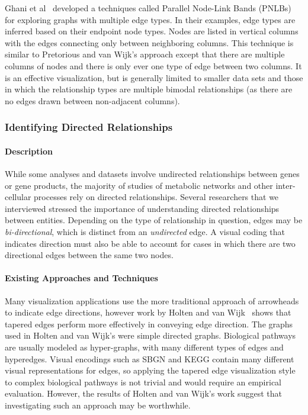 \documentclass[twocolumn]{bmcart}%
\begin{document}
Ghani et al~\cite{Ghani2013} developed a techniques called Parallel Node-Link Bands (PNLBs) for exploring graphs with multiple edge types.
In their examples, edge types are inferred based on their endpoint node types.
Nodes are listed in vertical columns with the edges connecting only between neighboring columns.
This technique is similar to Pretorious and van Wijk's approach except that there are multiple columns of nodes and there is only ever one type of edge between two columns.
It is an effective visualization, but is generally limited to smaller data sets and those in which the relationship types are multiple bimodal relationships (as there are no edges drawn between non-adjacent columns).

\subsubsection*{Identifying Directed Relationships}

\paragraph*{Description}

While some analyses and datasets involve undirected relationships between genes or gene products, the majority of studies of metabolic networks and other inter-cellular processes rely on directed relationships.
Several researchers that we interviewed stressed the importance of understanding directed relationships between entities.
Depending on the type of relationship in question, edges may be \textit{bi-directional}, which is distinct from an \textit{undirected} edge.
A visual coding that indicates direction must also be able to account for cases in which there are two directional edges between the same two nodes.

\paragraph*{Existing Approaches and Techniques}

Many visualization applications use the more traditional approach of arrowheads to indicate edge directions, however work by Holten and van Wijk~\cite{Holten2009} shows that tapered edges perform more effectively in conveying edge direction.
The graphs used in Holten and van Wijk's were simple directed graphs.
Biological pathways are usually modeled as hyper-graphs, with many different types of edges and hyperedges.
Visual encodings such as SBGN and KEGG contain many different visual representations for edges, so applying the tapered edge visualization style to complex biological pathways is not trivial and would require an empirical evaluation.
However, the results of Holten and van Wijk's work suggest that investigating such an approach may be worthwhile.
\end{document}
